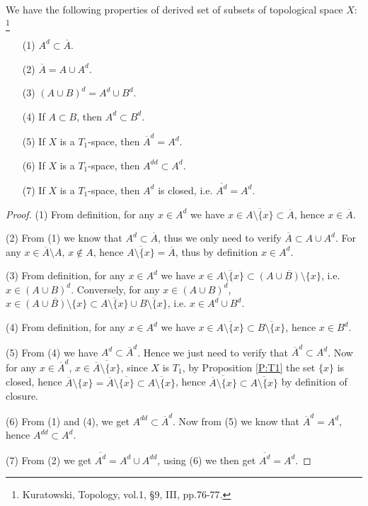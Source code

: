 \begin{lemma}  \label{L:der_set}
We have the following properties of derived set of subsets of
topological space $X$:
\footnote{Kuratowski, Topology, vol.1, \S 9, III, pp.76-77.}
\begin{enumerate}
  \item[(1)] $A^d\subset \overline{A}$.
  \item[(2)] $\overline{A} = A \cup A^d$.
  \item[(3)] $(A\cup B)^d = A^d \cup B^d$.
  \item[(4)] If $A\subset B$, then $A^d \subset B^d$.
  \item[(5)] If $X$ is a $T_1$-space, then $\overline{A}^d = A^d$.
  \item[(6)] If $X$ is a $T_1$-space, then $A^{dd} \subset A^d$.
  \item[(7)] If $X$ is a $T_1$-space, then $A^d$ is closed, i.e.
             $\overline{A^d}=A^d$.
\end{enumerate}
\end{lemma}
\begin{proof}
(1) From definition, for any $x\in A^d$ we have 
$x\in \overline{A\setminus\{x\}} \subset \overline{A}$,
hence $x\in\overline{A}$.

(2) From (1) we know that $A^d\subset \overline{A}$, thus we only need to verify
$\overline{A} \subset A \cup A^d$.
For any $x\in \overline{A}\setminus A$, $x\notin A$, hence 
$\overline{A\setminus\{x\}}=\overline{A}$, thus by definition
$x\in A^d$. 

(3) From definition, for any $x\in A^d$ we have 
$x\in \overline{A\setminus\{x\}} \subset \overline{(A\cup B)\setminus\{x\}}$,
i.e. $x\in (A\cup B)^d$.
Conversely, for any $x\in (A\cup B)^d$, 
$x\in \overline{(A\cup B)\setminus\{x\}} \subset
\overline{A\setminus\{x\}} \cup \overline{B\setminus\{x\}}$,
i.e. $x\in A^d \cup B^d$.

(4) From definition, for any $x\in A^d$ we have 
$x\in \overline{A\setminus\{x\}} \subset \overline{B\setminus\{x\}}$,
hence $x\in B^d$.

(5) From (4) we have $A^d\subset \overline{A}^d$. Hence we just need to verify
that $\overline{A}^d\subset A^d$. Now for any $x\in\overline{A}^d$, 
$x\in \overline{\overline{A}\setminus\{x\}}$,
since $X$ is $T_1$, by Proposition \ref{P:T1} the set $\{x\}$ is closed, hence
$\overline{A}\setminus\{x\}=\overline{A}\setminus\overline{\{x\}}
\subset \overline{A\setminus\{x\}}$,
hence
$\overline{\overline{A}\setminus\{x\}}\subset \overline{A\setminus\{x\}}$
by definition of closure.

(6) From (1) and (4), we get $A^{dd}\subset\overline{A}^d$. Now from (5) we know
that $\overline{A}^d=A^d$, hence $A^{dd}\subset A^d$.

(7) From (2) we get $\overline{A^d}=A^d\cup A^{dd}$, using (6) we then get
$\overline{A^d}=A^d$.
\end{proof}

